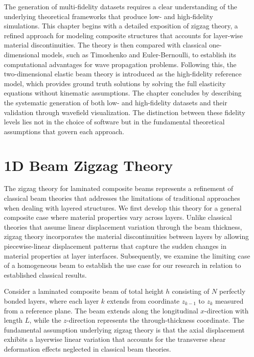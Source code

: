 \documentclass[12pt,a4paper]{report}
\begin{document}
The generation of multi-fidelity datasets requires a clear understanding of the underlying theoretical frameworks that produce low- and high-fidelity simulations. This chapter begins with a detailed exposition of zigzag theory, a refined approach for modeling composite structures that accounts for layer-wise material discontinuities. The theory is then compared with classical one-dimensional models, such as Timoshenko and Euler-Bernoulli, to establish its computational advantages for wave propagation problems. Following this, the two-dimensional elastic beam theory is introduced as the high-fidelity reference model, which provides ground truth solutions by solving the full elasticity equations without kinematic assumptions. The chapter concludes by describing the systematic generation of both low- and high-fidelity datasets and their validation through wavefield visualization. The distinction between these fidelity levels lies not in the choice of software but in the fundamental theoretical assumptions that govern each approach.


\section{1D Beam Zigzag Theory}
\label{sec:zigzag_theory}
The zigzag theory for laminated composite beams represents a refinement of classical beam theories that addresses the limitations of traditional approaches when dealing with layered structures. We first develop this theory for a general composite case where material properties vary across layers. Unlike classical theories that assume linear displacement variation through the beam thickness, zigzag theory incorporates the material discontinuities between layers by allowing piecewise-linear displacement patterns that capture the sudden changes in material properties at layer interfaces. Subsequently, we examine the limiting case of a homogeneous beam to establish the use case for our research in relation to established classical results.

Consider a laminated composite beam of total height $h$ consisting of $N$ perfectly bonded layers, where each layer $k$ extends from coordinate $z_{k-1}$ to $z_k$ measured from a reference plane. The beam extends along the longitudinal $x$-direction with length $L$, while the $z$-direction represents the through-thickness coordinate. The fundamental assumption underlying zigzag theory is that the axial displacement exhibits a layerwise linear variation that accounts for the transverse shear deformation effects neglected in classical beam theories.
\end{document}
